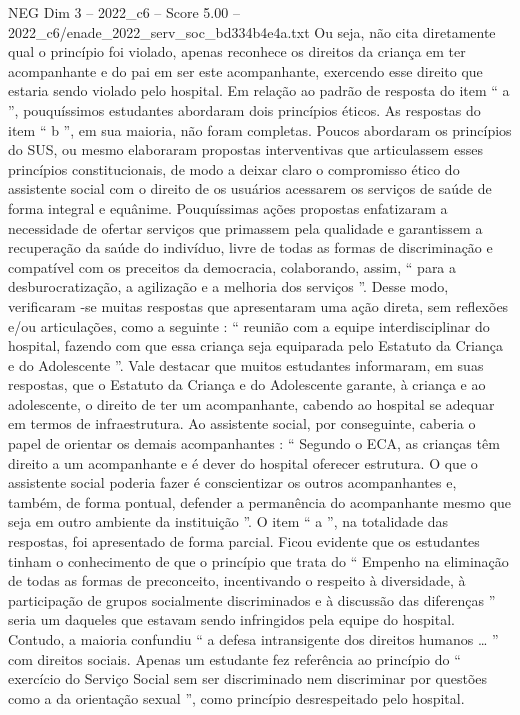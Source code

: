 \begin{textsample}{NEG Dim 3 – 2022\_c6 – Score 5.00 – 2022\_c6/enade\_2022\_serv\_soc\_bd334b4e4a.txt}
Ou seja, não cita diretamente qual o princípio foi violado, apenas reconhece os direitos da criança em ter acompanhante e do pai em ser este acompanhante, exercendo esse direito que estaria sendo violado pelo hospital.
Em relação ao padrão de resposta do item “ a ”, pouquíssimos estudantes abordaram dois princípios éticos.
As respostas do item “ b ”, em sua maioria, não foram completas.
Poucos abordaram os princípios do SUS, ou mesmo elaboraram propostas interventivas que articulassem esses princípios constitucionais, de modo a deixar claro o compromisso ético do assistente social com o direito de os usuários acessarem os serviços de saúde de forma integral e equânime.
Pouquíssimas ações propostas enfatizaram a necessidade de ofertar serviços que primassem pela qualidade e garantissem a recuperação da saúde do indivíduo, livre de todas as formas de discriminação e compatível com os preceitos da democracia, colaborando, assim, “ para a desburocratização, a agilização e a melhoria dos serviços ”.
Desse modo, verificaram -se muitas respostas que apresentaram uma ação direta, sem reflexões e/ou articulações, como a seguinte : “ reunião com a equipe interdisciplinar do hospital, fazendo com que essa criança seja equiparada pelo Estatuto da Criança e do Adolescente ”.
Vale destacar que muitos estudantes informaram, em suas respostas, que o Estatuto da Criança e do Adolescente garante, à criança e ao adolescente, o direito de ter um acompanhante, cabendo ao hospital se adequar em termos de infraestrutura.
Ao assistente social, por conseguinte, caberia o papel de orientar os demais acompanhantes : “ Segundo o ECA, as crianças têm direito a um acompanhante e é dever do hospital oferecer estrutura.
O que o assistente social poderia fazer é conscientizar os outros acompanhantes e, também, de forma pontual, defender a permanência do acompanhante mesmo que seja em outro ambiente da instituição ”.
O item “ a ”, na totalidade das respostas, foi apresentado de forma parcial.
Ficou evidente que os estudantes tinham o conhecimento de que o princípio que trata do “ Empenho na eliminação de todas as formas de preconceito, incentivando o respeito à diversidade, à participação de grupos socialmente discriminados e à discussão das diferenças ” seria um daqueles que estavam sendo infringidos pela equipe do hospital.
Contudo, a maioria confundiu “ a defesa intransigente dos direitos humanos … ” com direitos sociais.
Apenas um estudante fez referência ao princípio do “ exercício do Serviço Social sem ser discriminado nem discriminar por questões como a da orientação sexual ”, como princípio desrespeitado pelo hospital.

\end{textsample}
